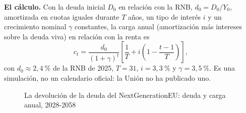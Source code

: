 \documentclass[11pt]{article}
\begin{document}
\begin{anotaciones}
\textbf{El cálculo.} Con la deuda inicial $D_0$ en relación con la RNB, $d_0=D_0/Y_0$, amortizada en cuotas iguales durante $T$ años, un tipo de interés $i$ y un crecimiento nominal $\gamma$ constantes, la carga anual (amortización más intereses sobre la deuda viva) en relación con la renta es
\[
c_t=\frac{d_0}{(1+\gamma)^t}\left[\frac1T+i\left(1-\frac{t-1}{T}\right)\right],
\]
con $d_0\approx2{,}4~\%$ de la RNB de 2025, $T=31$, $i=3{,}3~\%$ y $\gamma=3{,}5~\%$. Es una simulación, no un calendario oficial: la Unión no ha publicado uno.
\end{anotaciones}

\begin{figure}[H]
\centering
\caption{La devolución de la deuda del NextGenerationEU: deuda y carga anual, 2028-2058}\label{fig:deuda-ngeu}
\end{figure}
\end{document}
